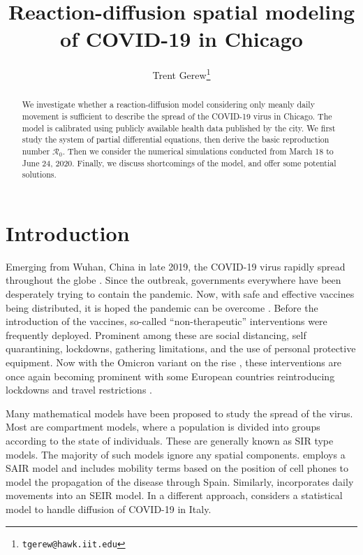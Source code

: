 \documentclass[11pt]{article}
\title{Reaction-diffusion spatial modeling of COVID-19 in Chicago}
\author{Trent Gerew\thanks{\texttt{tgerew@hawk.iit.edu}}}
\institute{Department of Applied Mathematics, Illinois Institute of Technology, Chicago, Illinois}
\newcommand{\Ro}{\mathcal{R}_0}
\begin{document}
\maketitle

\begin{abstract}
	We investigate whether a reaction-diffusion model considering only meanly daily movement is sufficient to describe the spread of the COVID-19 virus in Chicago.
	The model is calibrated using publicly available health data published by the city.
	We first study the system of partial differential equations, then derive the basic reproduction number $\Ro$.
	Then we consider the numerical simulations conducted from March 18 to June 24, 2020.
	Finally, we discuss shortcomings of the model, and offer some potential solutions.
\end{abstract}

\section{Introduction}
	Emerging from Wuhan, China in late 2019, the COVID-19 virus rapidly spread throughout the globe \cite{covid-name}.
	Since the outbreak, governments everywhere have been desperately trying to contain the pandemic.
	Now, with safe and effective vaccines being distributed, it is hoped the pandemic can be overcome \cite{vaccine}.
	Before the introduction of the vaccines, so-called ``non-therapeutic'' interventions \cite{interventions1} were frequently deployed.
	Prominent among these are social distancing, self quarantining, lockdowns, gathering limitations, and the use of personal protective equipment.
	Now with the Omicron variant on the rise \cite{omicron}, these interventions are once again becoming prominent with some European countries reintroducing lockdowns and travel restrictions \cite{lockdowns}.
	
	Many mathematical models have been proposed to study the spread of the virus.
	Most are compartment models, where a population is divided into groups according to the state of individuals.
	These are generally known as SIR type models.
	The majority of such models ignore any spatial components.
	\cite{s+t+spain} employs a SAIR model and includes mobility terms based on the position of cell phones to model the propagation of the disease through Spain.
	Similarly, \cite{Danon2020.02.12.20022566} incorporates daily movements into an SEIR model.
	In a different approach, \cite{giuliani2020modelling} considers a statistical model to handle diffusion of COVID-19 in Italy.
	
\end{document}
